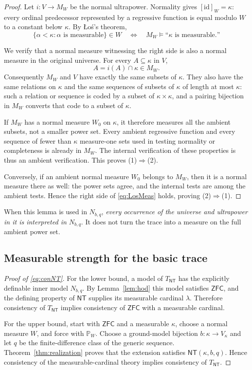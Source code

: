 \documentclass[11pt,letterpaper]{article}
\theoremstyle{definition}
\numberwithin{equation}{section}
\newcommand{\ZFC}{\mathsf{ZFC}}
\newcommand{\id}{\mathrm{id}}
\newcommand{\PP}{\mathbb P}
\newcommand{\NT}{\mathsf{NT}}
\begin{document}
\begin{proof}
Let $i:V\to M_W$ be the normal ultrapower. Normality gives
$[\id]_W=\kappa$: every ordinal predecessor represented by a regressive
function is equal modulo $W$ to a constant below $\kappa$. By \L o\'s's
theorem,
\begin{equation}\label{eq:LosMeas}
 \{\alpha<\kappa:\alpha\text{ is measurable}\}\in W
 \quad\Longleftrightarrow\quad
 M_W\models\text{``$\kappa$ is measurable.''}
\end{equation}

We verify that a normal measure witnessing the right side is also a
normal measure in the original universe. For every $A\subseteq\kappa$
in $V$,
\[
 A=i(A)\cap\kappa\in M_W.
\]
Consequently $M_W$ and $V$ have exactly the same subsets of $\kappa$.
They also have the same relations on $\kappa$ and the same sequences of
subsets of $\kappa$ of length at most $\kappa$: such a relation or
sequence is coded by a subset of $\kappa\times\kappa$, and a pairing
bijection in $M_W$ converts that code to a subset of $\kappa$.

If $M_W$ has a normal measure $W_0$ on $\kappa$, it therefore measures
all the ambient subsets, not a smaller power set. Every ambient
regressive function and every sequence of fewer than $\kappa$
measure-one sets used in testing normality or completeness is already
in $M_W$. The internal verification of these properties is thus an
ambient verification. This proves (1)$\Rightarrow$(2).

Conversely, if an ambient normal measure $W_0$ belongs to $M_W$, then
it is a normal measure there as well: the power sets agree, and the
internal tests are among the ambient tests. Hence the right side of
\eqref{eq:LosMeas} holds, proving (2)$\Rightarrow$(1).
\end{proof}

When this lemma is used in $N_{b,q}$, \emph{every occurrence of the
universe and ultrapower in it is interpreted in $N_{b,q}$}. It does not
turn the trace into a measure on the full ambient power set.

\subsection{Measurable strength for the basic trace}

\begin{proof}[Proof of \eqref{eq:conNT}]
For the lower bound, a model of $T_{\NT}$ has the explicitly definable
inner model $N_{b,q}$. By Lemma~\ref{lem:hod} this model satisfies
$\ZFC$, and the defining property of $\NT$ supplies its measurable
cardinal $\lambda$. Therefore consistency of $T_{\NT}$ implies
consistency of $\ZFC$ with a measurable cardinal.

For the upper bound, start with $\ZFC$ and a measurable $\kappa$,
choose a normal measure $W$, and force with $\PP_W$. Choose a
ground-model bijection $b:\kappa\to V_\kappa$ and let $q$ be the
finite-difference class of the generic sequence. Theorem~\ref{thm:realization}
proves that the extension satisfies $\NT(\kappa,b,q)$. Hence
consistency of the measurable-cardinal theory implies consistency of
$T_{\NT}$.
\end{proof}
\end{document}
